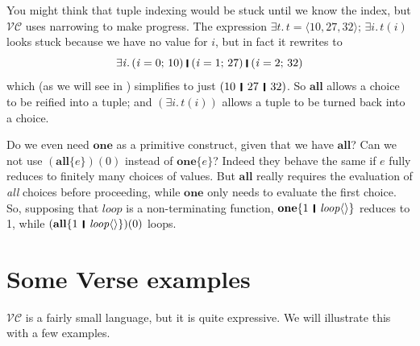 \documentclass[acmsmall,review,dvipsnames]{acmart}
\newcommand{\Varid}[1]{\mathit{#1}}
\newcommand{\versecalc}{$\mathcal{VC}$}
\begin{document}
You might think that tuple indexing would be stuck until we know the index,
but \versecalc{} uses narrowing to make progress.
The expression \ensuremath{\exists\Varid{t}.\,\Varid{t}\mathrel{=}\langle{}\mathrm{10},\mathrm{27},\mathrm{32}\rangle;\,\exists\Varid{i}.\,\Varid{t}(\Varid{i})}
looks stuck because we have no value for \ensuremath{\Varid{i}}, but in fact it rewrites to
$$
\ensuremath{\exists\Varid{i}.\,(\Varid{i}\mathrel{=}\mathrm{0};\,\mathrm{10})\;\rule[-0.3mm]{0.5mm}{2.5mm}\;(\Varid{i}\mathrel{=}\mathrm{1};\,\mathrm{27})\;\rule[-0.3mm]{0.5mm}{2.5mm}\;(\Varid{i}\mathrel{=}\mathrm{2};\,\mathrm{32})}
$$
which (as we will see in ) simplifies
to just \ensuremath{(\mathrm{10}\hspace{1mm}\mathop{\rule[-0.3mm]{0.5mm}{2.5mm}}\hspace{1mm}\mathrm{27}\hspace{1mm}\mathop{\rule[-0.3mm]{0.5mm}{2.5mm}}\hspace{1mm}\mathrm{32})}.
So \ensuremath{\textbf{all}} allows a choice to be reified into a tuple; and \ensuremath{(\exists\Varid{i}.\,\Varid{t}(\Varid{i}))} allows a
tuple to be turned back into a choice.

Do we even need \ensuremath{\textbf{one}} as a primitive construct, given that we have
\ensuremath{\textbf{all}}? Can we not use \ensuremath{(\textbf{all}\{\Varid{e}\})(\mathrm{0})} instead of \ensuremath{\textbf{one}\{\Varid{e}\}}? Indeed
they behave the same if \ensuremath{\Varid{e}} fully reduces to finitely many choices of
values. But \ensuremath{\textbf{all}} really requires the evaluation of \emph{all}
choices before proceeding, while \ensuremath{\textbf{one}} only needs to evaluate the
first choice. So, supposing that \ensuremath{\Varid{loop}} is a non-terminating function,
\ensuremath{\textbf{one}\{\mathrm{1}\hspace{1mm}\mathop{\rule[-0.3mm]{0.5mm}{2.5mm}}\hspace{1mm}\Varid{loop}\langle\rangle\}} reduces to 1, while
\ensuremath{(\textbf{all}\{\mathrm{1}\hspace{1mm}\mathop{\rule[-0.3mm]{0.5mm}{2.5mm}}\hspace{1mm}\Varid{loop}\langle\rangle\})(\mathrm{0})} loops.


\section{Some Verse examples} \label{sec:verse}
\versecalc{} is a fairly small language, but it is quite expressive.
We will illustrate this with a few examples.
\end{document}
